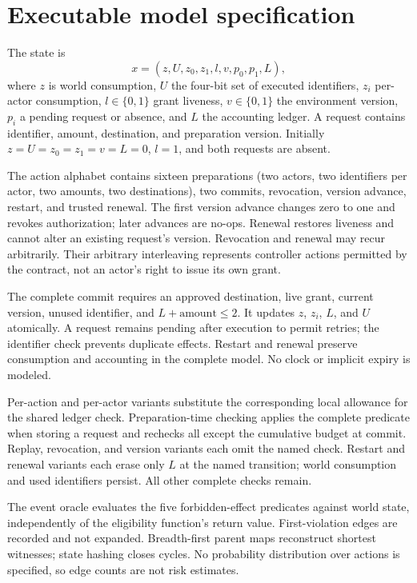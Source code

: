 \section{Executable model specification}
\label{app:model}
The state is
\[
x=(z,U,z_0,z_1,l,v,p_0,p_1,L),
\]
where $z$ is world consumption, $U$ the four-bit set of executed identifiers, $z_i$ per-actor consumption, $l\in\{0,1\}$ grant liveness, $v\in\{0,1\}$ the environment version, $p_i$ a pending request or absence, and $L$ the accounting ledger. A request contains identifier, amount, destination, and preparation version. Initially $z=U=z_0=z_1=v=L=0$, $l=1$, and both requests are absent.

The action alphabet contains sixteen preparations (two actors, two identifiers per actor, two amounts, two destinations), two commits, revocation, version advance, restart, and trusted renewal. The first version advance changes zero to one and revokes authorization; later advances are no-ops. Renewal restores liveness and cannot alter an existing request's version. Revocation and renewal may recur arbitrarily. Their arbitrary interleaving represents controller actions permitted by the contract, not an actor's right to issue its own grant.

The complete commit requires an approved destination, live grant, current version, unused identifier, and $L+\text{amount}\le2$. It updates $z$, $z_i$, $L$, and $U$ atomically. A request remains pending after execution to permit retries; the identifier check prevents duplicate effects. Restart and renewal preserve consumption and accounting in the complete model. No clock or implicit expiry is modeled.

 Per-action and per-actor variants substitute the corresponding local allowance for the shared ledger check. Preparation-time checking applies the complete predicate when storing a request and rechecks all except the cumulative budget at commit. Replay, revocation, and version variants each omit the named check. Restart and renewal variants each erase only $L$ at the named transition; world consumption and used identifiers persist. All other complete checks remain.

 The event oracle evaluates the five forbidden-effect predicates against world state, independently of the eligibility function's return value. First-violation edges are recorded and not expanded. Breadth-first parent maps reconstruct shortest witnesses; state hashing closes cycles. No probability distribution over actions is specified, so edge counts are not risk estimates.

